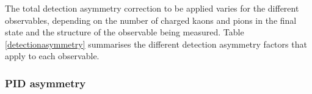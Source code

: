 The total detection asymmetry correction to be applied varies for the different \CP observables, depending on the number of charged kaons and pions in the final state and the structure of the \CP observable being measured. Table \ref{detectionasymmetry} summarises the different detection asymmetry factors that apply to each observable. 

{\footnotesize
\begin{table}[h]
\caption{Detection asymmetry factors for each of the observables in the \CP fit.}
\label{detectionasymmetry}
\end{table}}

\subsubsection{PID asymmetry}

